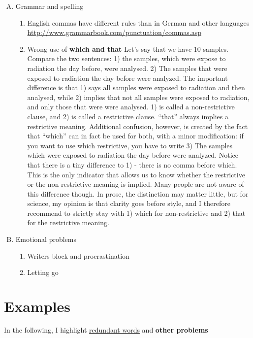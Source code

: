\documentclass{tufte-book}
\begin{document}
\begin{enumerate}[(A)]
\item Grammar and spelling

\begin{enumerate}
	\item English commas have different rules than in German and other languages \url{http://www.grammarbook.com/punctuation/commas.asp}
	\item Wrong use of \textbf{which and that} Let's say that we have 10 samples. Compare the two sentences: 1) the samples, which were expose to radiation the day before, were analysed. 2) The samples that were exposed to radiation the day before were analyzed. The important difference is that 1) says all samples were exposed to radiation and then analysed, while 2) implies that not all samples were exposed to radiation, and only those that were were analysed. 1) is called a non-restrictive clause, and 2) is called a restrictive clause. ``that'' always implies a restrictive meaning. Additional confusion, however, is created by the fact that ``which'' can in fact be used for both, with a minor modification: if you want to use which restrictive, you have to write 3) The samples which were exposed to radiation the day before were analyzed. Notice that there is a tiny difference to 1) - there is no comma before which. This is the only indicator that allows us to know whether the restrictive or the non-restrictive meaning is implied. Many people are not aware of this difference though. In prose, the distinction may matter little, but for science, my opinion is that clarity goes before style, and I therefore recommend to strictly stay with 1) which for non-restrictive and 2) that for the restrictive meaning.
\end{enumerate}

\item Emotional problems

\begin{enumerate}
	\item Writers block and procrastination
	\item Letting go
\end{enumerate}


\end{enumerate}


\section{Examples}

In the following, I highlight \uline{redundant words} and \textbf{other problems}
\end{document}
